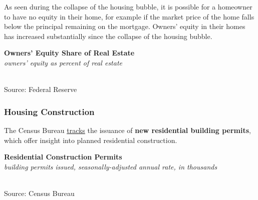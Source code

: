 \documentclass{report}
\makeatletter
\newcommand{\tbllink}[1]{\href{https://raw.githubusercontent.com/bdecon/US-chartbook/master/chartbook/data/#1}{\faTable}}
\newcommand*\short[1]{\expandafter\@gobbletwo\number\numexpr#1\relax}
\newcommand{\dateaxisticks}{
		date coordinates in=x, axis line style={draw=none},
		xmax={2022-10-31},
		max space between ticks=40,	    
		xtick={{1990-01-01}, {1992-01-01}, {1994-01-01}, 
			{1996-01-01}, {1998-01-01}, {2000-01-01}, 
			{2002-01-01}, {2004-01-01}, {2006-01-01},
			{2008-01-01}, {2010-01-01}, {2012-01-01}, {2014-01-01},
		    {2016-01-01}, {2018-01-01}, {2020-01-01}, {2022-01-01}, 
		    {2024-01-01}, {2026-01-01}},
		minor xtick={{1989-01-01}, {1991-01-01}, {1993-01-01},
			{1995-01-01}, {1997-01-01}, {1999-01-01}, 
			{2001-01-01}, {2003-01-01}, {2005-01-01}, {2007-01-01},
		    {2009-01-01}, {2011-01-01}, {2013-01-01}, {2015-01-01},
		    {2017-01-01}, {2019-01-01}, {2021-01-01}, {2023-01-01}, 
		    {2025-01-01}, {2027-01-01}},
		enlarge y limits={0.06}, enlarge x limits={0.01},
		}
\newcommand{\shdateaxisticks}{
		date coordinates in=x, axis line style={draw=none},
		xmax={2022-10-31},
		max space between ticks=40,	    
		xtick={{1990-01-01}, {1995-01-01}, {2000-01-01}, 
			{2005-01-01}, {2010-01-01}, {2015-01-01}, {2020-01-01}},
		minor xtick={},
		enlarge y limits={0.06}, enlarge x limits={0.01},
		}
\newcommand{\bbar}[2]{extra #1 ticks = {{#2}}, extra #1 tick labels = ,
		extra #1 tick style = {grid=major, grid style={thick, black!25}},}
\newcommand{\stdline}[4]{\addplot[very thick, no markers, color=#1] 
		table [x=#2, y=#3, col sep=comma] {#4};	}
\newcommand{\rbars}{
		\fill[color=black!10] (axis cs:{1990-07-01},\pgfkeysvalueof{/pgfplots/ymin}) rectangle 
			(axis cs:{1991-03-01}, \pgfkeysvalueof{/pgfplots/ymax});
		\fill[color=black!10] (axis cs:{2007-12-01},\pgfkeysvalueof{/pgfplots/ymin}) rectangle 
			(axis cs:{2009-07-01}, \pgfkeysvalueof{/pgfplots/ymax});
		\fill[color=black!10] (axis cs:{2001-03-01},\pgfkeysvalueof{/pgfplots/ymin}) rectangle 
			(axis cs:{2001-11-01}, \pgfkeysvalueof{/pgfplots/ymax});
		\fill[color=black!10] (axis cs:{2020-02-01},\pgfkeysvalueof{/pgfplots/ymin}) rectangle 
			(axis cs:{2020-05-01}, \pgfkeysvalueof{/pgfplots/ymax});}
\makeatother
\begin{document}
{\begin{minipage}{0.76\textwidth}
As seen during the collapse of the housing bubble, it is possible for a homeowner to have no equity in their home, for example if the market price of the home falls below the principal remaining on the mortgage. Owners' equity in their homes has increased substantially since the collapse of the housing bubble. 
\end{minipage}
\vspace{1mm}

\begin{minipage}{0.31\textwidth}
\small 
\end{minipage}\hspace{7mm}
\begin{minipage}{0.41\textwidth}
\normalsize \textbf{Owners' Equity Share of Real Estate}\\
\footnotesize{\textit{owners' equity as percent of real estate}}\\
\hspace*{-2mm} \\
\footnotesize{Source: Federal Reserve} \hspace{30mm} \tbllink{homeeq.csv} 

\end{minipage}
\newpage
\begin{minipage}{0.76\textwidth}
\subsubsection*{Housing Construction}
\small The Census Bureau \href{https://www.census.gov/construction/bps/}{tracks} the issuance of \textbf{new residential building permits}, which offer insight into planned residential construction. 
\vspace{1mm}

\normalsize{\textbf{Residential Construction Permits}}\\
\footnotesize{\textit{building permits issued, seasonally-adjusted annual rate, in thousands}}\\
\hspace*{-2mm} \\
\footnotesize{Source: Census Bureau} \hfill \tbllink{permits_total.csv}
\vspace{2mm}


\end{minipage}}
\end{document}
